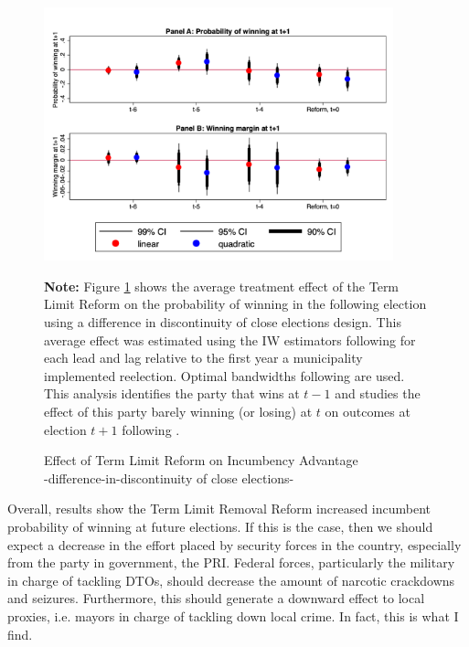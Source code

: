 \documentclass[12pt]{amsart}
\numberwithin{equation}{section}
\theoremstyle{definition}
\theoremstyle{definition}
\theoremstyle{definition}
\begin{document}
 \begin{figure}[h]   
\centering
 \caption{Effect of Term Limit Reform on Incumbency Advantage \\ -difference-in-discontinuity of close elections-}
 \label{fig:parallel_trend}
\includegraphics[width=0.9\textwidth]{../Figures_incumbency/parallel_trend.png}
       \captionsetup{justification=centering}
         
 \textbf{Note:} Figure \ref{fig:parallel_trend} shows the average treatment effect of the Term Limit Reform on the probability of winning in the following election using a difference in discontinuity of close elections design. This average effect was estimated using the IW estimators following \citet{abraham_sun_2020} for each lead and lag relative to the first year a municipality implemented reelection. Optimal bandwidths following \citet{calonicoetal_2014} are used. This analysis identifies the party that wins at $t-1$ and studies the effect of this party barely winning (or losing) at $t$ on outcomes at election $t+1$ following \citet{klasnja_titiunik_2017}.  
 
\end{figure}   

Overall, results show the Term Limit Removal Reform increased incumbent probability of winning at future elections. If this is the case, then we should expect a decrease in the effort placed by security forces in the country, especially from the party in government, the PRI. Federal forces, particularly the military in charge of tackling DTOs, should decrease the amount of narcotic crackdowns and seizures. Furthermore, this should generate a downward effect to local proxies, i.e. mayors in charge of tackling down local crime. In fact, this is what I find. 
   \clearpage
  
\end{document}
